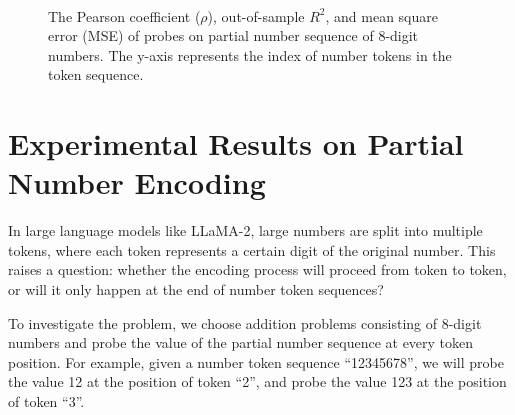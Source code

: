 \documentclass[11pt]{article}
\begin{document}
\begin{figure}[ht]
{    }
    \\
    \caption{The Pearson coefficient ($\rho$), out-of-sample $R^2$, and mean square error (MSE) of probes on partial number sequence of 8-digit numbers. The y-axis represents the index of number tokens in the token sequence.}
    \label{fig:appendix_incremental}
\end{figure}


\section{Experimental Results on Partial Number Encoding}
\label{sec:appendix_partial}
In large language models like LLaMA-2, large numbers are split into multiple tokens, where each token represents a certain digit of the original number.
This raises a question: whether the encoding process will proceed from token to token, or will it only happen at the end of number token sequences?

To investigate the problem, we choose addition problems consisting of 8-digit numbers and probe the value of the partial number sequence at every token position.
For example, given a number token sequence ``12345678'', we will probe the value 12 at the position of token ``2'', and probe the value 123 at the position of token ``3''.
\end{document}
